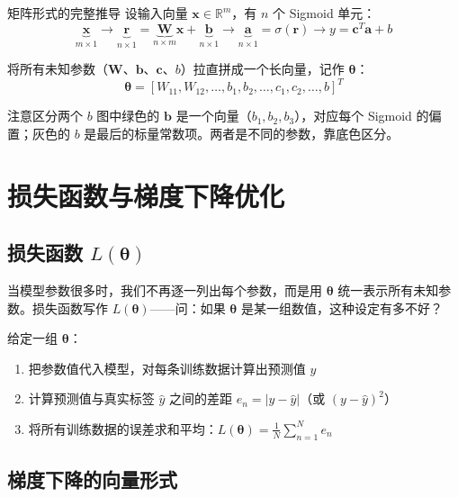 \documentclass[a4paper]{article}
\begin{document}
\begin{knowledgebox}{矩阵形式的完整推导}
    设输入向量 $\boldsymbol{x} \in \mathbb{R}^{m}$，有 $n$ 个 Sigmoid 单元：
    \[
    \underbrace{\boldsymbol{x}}_{m \times 1} \longrightarrow
    \underbrace{\boldsymbol{r}}_{n \times 1} = \underbrace{\boldsymbol{W}}_{n \times m} \boldsymbol{x} + \underbrace{\boldsymbol{b}}_{n \times 1}
    \longrightarrow
    \underbrace{\boldsymbol{a}}_{n \times 1} = \sigma(\boldsymbol{r})
    \longrightarrow
    y = \boldsymbol{c}^T \boldsymbol{a} + b
    \]

    将所有未知参数（$\boldsymbol{W}$、$\boldsymbol{b}$、$\boldsymbol{c}$、$b$）拉直拼成一个长向量，记作 $\boldsymbol{\theta}$：
    \[
    \boldsymbol{\theta} = [W_{11}, W_{12}, \ldots, b_1, b_2, \ldots, c_1, c_2, \ldots, b]^T
    \]
\end{knowledgebox}

\begin{warningbox}{注意区分两个 $b$}
    图中绿色的 $\boldsymbol{b}$ 是一个向量（$b_1, b_2, b_3$），对应每个 Sigmoid 的偏置；灰色的 $b$ 是最后的标量常数项。两者是不同的参数，靠底色区分。
\end{warningbox}

\section{损失函数与梯度下降优化}

\subsection{损失函数 $L(\boldsymbol{\theta})$}

当模型参数很多时，我们不再逐一列出每个参数，而是用 $\boldsymbol{\theta}$ 统一表示所有未知参数。损失函数写作 $L(\boldsymbol{\theta})$——问：如果 $\boldsymbol{\theta}$ 是某一组数值，这种设定有多不好？

给定一组 $\boldsymbol{\theta}$：
\begin{enumerate}
    \item 把参数值代入模型，对每条训练数据计算出预测值 $y$
    \item 计算预测值与真实标签 $\hat{y}$ 之间的差距 $e_n = |y - \hat{y}|$（或 $(y - \hat{y})^2$）
    \item 将所有训练数据的误差求和平均：$L(\boldsymbol{\theta}) = \frac{1}{N}\sum_{n=1}^{N} e_n$
\end{enumerate}

\subsection{梯度下降的向量形式}
\end{document}
